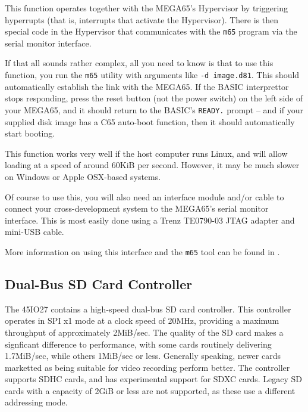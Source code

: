 \begin{enumerate}
This function operates together with the MEGA65's Hypervisor by
triggering hyperrupts (that is, interrupts that activate the
Hypervisor).  There is then special code in the Hypervisor that
communicates with the {\tt m65} program via the serial monitor
interface.

If that all sounds rather complex, all you need to know is that to use
this function, you run the {\tt m65} utility with arguments like
{\tt -d image.d81}.  This should automatically establish the link with
the MEGA65.  If the BASIC interprettor stops responding, press the
reset button (not the power switch) on the left side of your MEGA65,
and it should return to the BASIC's {\tt READY.} prompt -- and if your
supplied disk image has a C65 auto-boot function, then it should
automatically start booting.

This function works very well if the host computer runs Linux, and
will allow loading at a speed of around 60KiB per second.  However, it
may be much slower on Windows or Apple OSX-based systems.

Of course to use this, you will also need an interface module and/or
cable to connect your cross-development system to the MEGA65's serial
monitor interface. This is most easily done using a Trenz TE0790-03
JTAG adapter and mini-USB cable.

More information on using this interface and the {\tt m65} tool can be
found in .

\subsection{Dual-Bus SD Card Controller}

The 45IO27 contains a high-speed dual-bus SD card controller.  This
controller operates in SPI x1 mode at a clock speed of 20MHz,
providing a maximum throughput of approximately 2MiB/sec.  The quality
of the SD card makes a signficant difference to performance, with some
cards routinely delivering 1.7MiB/sec, while others 1MiB/sec or
less. Generally speaking, newer cards marketted as being suitable for
video recording perform better.  The controller supports SDHC cards,
and has experimental support for SDXC cards.  Legacy SD cards with a
capacity of 2GiB or less are not supported, as these use a different
addressing mode.


\end{enumerate}
